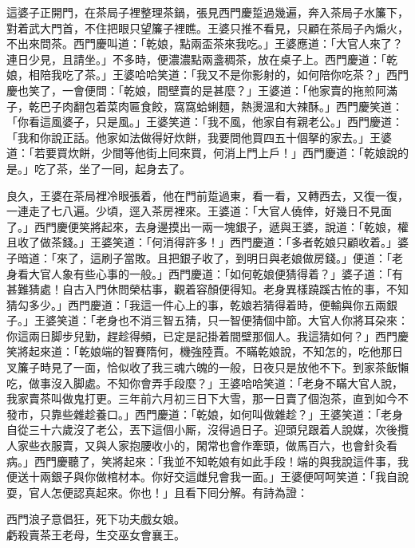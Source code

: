 這婆子正開門，在茶局子裡整理茶鍋，張見西門慶踅過幾遍，奔入茶局子水簾下，對着武大門首，不住把眼只望簾子裡瞧。王婆只推不看見，{}只顧在茶局子內煽火，不出來問茶。西門慶叫道：「乾娘，點兩盃茶來我吃。」王婆應道：「大官人來了？連日少見，{}且請坐。」不多時，便濃濃點兩盞稠茶，放在桌子上。西門慶道：「乾娘，相陪我吃了茶。」王婆哈哈笑道：「我又不是你影射的，如何陪你吃茶？」西門慶也笑了，一會便問：「乾娘，間壁賣的是甚麼？」王婆道：「他家賣的拖煎阿滿子，乾巴子肉翻包着菜肉匾食餃，窩窩蛤蜊麵，熱燙溫和大辣酥。」{}西門慶笑道：「你看這風婆子，只是風。」王婆笑道：「我不風，他家自有親老公。」{}西門慶道：「我和你說正話。他家如法做得好炊餅，我要問他買四五十個拏的家去。」王婆道：「若要買炊餅，少間等他街上囘來買，何消上門上戶！」西門慶道：「乾娘說的是。」吃了茶，坐了一囘，起身去了。

良久，王婆在茶局裡冷眼張着，他在門前踅過東，看一看，又轉西去，又復一復，一連走了七八遍。少頃，逕入茶房裡來。王婆道：「大官人僥倖，好幾日不見面了。」{}西門慶便笑將起來，去身邊摸出一兩一塊銀子，遞與王婆，說道：「乾娘，權且收了做茶錢。」王婆笑道：「何消得許多！」西門慶道：「多者乾娘只顧收着。」婆子暗道：「來了，這刷子當敗。且把銀子收了，到明日與老娘做房錢。」便道：「老身看大官人象有些心事的一般。」{}西門慶道：「如何乾娘便猜得着？」婆子道：「有甚難猜處！自古入門休問榮枯事，觀着容顏便得知。老身異樣蹺蹊古恠的事，不知猜勾多少。」西門慶道：「我這一件心上的事，乾娘若猜得着時，便輸與你五兩銀子。」王婆笑道：「老身也不消三智五猜，只一智便猜個中節。大官人你將耳朶來：你這兩日脚步兒勤，趕趁得頻，已定是記掛着間壁那個人。我這猜如何？」西門慶笑將起來道：「乾娘端的智賽隋何，機強陸賈。不瞞乾娘說，不知怎的，吃他那日叉簾子時見了一面，恰似收了我三魂六魄的一般，日夜只是放他不下。到家茶飯懶吃，做事沒入脚處。不知你會弄手段麼？」王婆哈哈笑道：「老身不瞞大官人說，我家賣茶叫做鬼打更。三年前六月初三日下大雪，那一日賣了個泡茶，直到如今不發市，只靠些雜趁養口。」西門慶道：「乾娘，如何叫做雜趁？」王婆笑道：「老身自從三十六歲沒了老公，丟下這個小厮，沒得過日子。迎頭兒跟着人說媒，次後攬人家些衣服賣，又與人家抱腰收小的，閑常也會作牽頭，做馬百六，也會針灸看病。」{}西門慶聽了，笑將起來：「我並不知乾娘有如此手段！端的與我說這件事，我便送十兩銀子與你做棺材本。你好交這雌兒會我一面。」王婆便呵呵笑道：「我自說耍，官人怎便認真起來。你也！」且看下囘分解。有詩為證：

\begin{myquote}
西門浪子意倡狂，死下功夫戲女娘。\\虧殺賣茶王老母，生交巫女會襄王。
\end{myquote}

